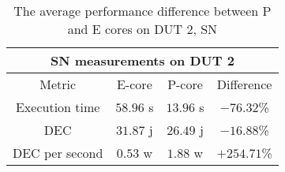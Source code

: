 \begin{table}[H]
    \centering
    \begin{tabular}{|| c | c | c | c ||}
    \hline
    \multicolumn{4}{||c||}{SN measurements on DUT 2} \\ [0.5ex] \hline\hline
    Metric & E-core & P-core & Difference \\\hline
    Execution time & $58.96$ s & $13.96$ s & $-76.32$\% \\
    DEC & $31.87$ j & $26.49$ j & $-16.88$\% \\
    DEC per second & $0.53$ w & $1.88$ w & $+254.71$\% \\\hline
    \end{tabular}
    \caption{The average performance difference between P and E cores on DUT 2, SN}
    \label{tab:dut-2-exp-3-sn}
\end{table}











